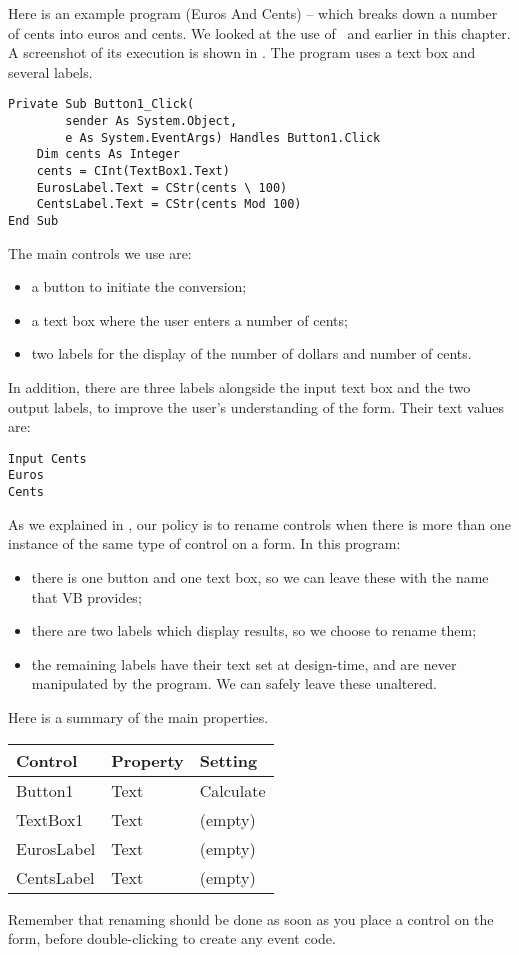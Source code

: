 		Here is an example program (Euros And Cents) – which breaks down a number of cents into euros and cents. We looked at the use of \ and  earlier in this chapter. A screenshot of its execution is shown in . The program uses a text box and several labels.
		\begin{lstlisting}
Private Sub Button1_Click(
		sender As System.Object,
		e As System.EventArgs) Handles Button1.Click
	Dim cents As Integer
	cents = CInt(TextBox1.Text)
	EurosLabel.Text = CStr(cents \ 100)
	CentsLabel.Text = CStr(cents Mod 100)
End Sub
		\end{lstlisting}
		The main controls we use are:
		\begin{itemize}
			\item a button to initiate the conversion;
			\item a text box where the user enters a number of cents;
			\item two labels for the display of the number of dollars and number of cents.
		\end{itemize}
		In addition, there are three labels alongside the input text box and the two output labels, to improve the user's understanding of the form. Their text values are:
		\begin{lstlisting}
Input Cents
Euros
Cents
		\end{lstlisting}
		As we explained in , our policy is to rename controls when there is more than one instance of the same type of control on a form. In this program:
		\begin{itemize}
			\item there is one button and one text box, so we can leave these with the name that VB provides;
			\item there are two labels which display results, so we choose to rename them;
			\item the remaining labels have their text set at design-time, and are never manipulated by the program. We can safely leave these unaltered.
		\end{itemize}
		Here is a summary of the main properties.

		\begin{center}
			\begin{tabular}{lll}
				\toprule Control &	Property	 & Setting \\ \midrule
				Button1 & Text & Calculate\\
				TextBox1 & Text & (empty)\\
				EurosLabel & Text & (empty)\\
				CentsLabel & Text & (empty)\\ \bottomrule
			\end{tabular}
		\end{center}
		Remember that renaming should be done as soon as you place a control on the form, before double-clicking to create any event code.
		
